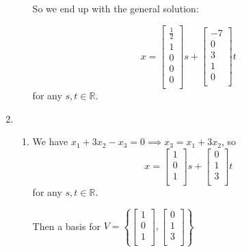 \documentclass[12pt,letterpaper]{article}
\begin{document}
\begin{enumerate}
\begin{enumerate}
          So we end up with the general solution:

          \[
            x =
            \begin{bmatrix}
              \frac{1}{2} \\
              1 \\
              0 \\
              0 \\
              0 \\
            \end{bmatrix}
            s
            +
            \begin{bmatrix}
              -7 \\
              0 \\
              3 \\
              1 \\
              0 \\
            \end{bmatrix}
            t
          \]
          for any $s, t \in \mathbb{R}$.
      \end{enumerate}
    \item
      \begin{enumerate}
        \item
          We have $x_1 + 3x_2 - x_3 = 0 \implies x_3 = x_1 + 3x_2$,
          so
          \[
            x =
            \begin{bmatrix}
              1 \\
              0 \\
              1 \\
            \end{bmatrix}
            s
            +
            \begin{bmatrix}
              0 \\
              1 \\
              3 \\
            \end{bmatrix}
            t
          \]
          for any $s, t \in \mathbb{R}$.

          Then a basis for $V = \left\{\begin{bmatrix}1 \\ 0 \\ 1 \\\end{bmatrix}, \begin{bmatrix}0 \\ 1 \\ 3 \\\end{bmatrix}\right\}$


\end{enumerate}
\end{enumerate}
\end{document}
